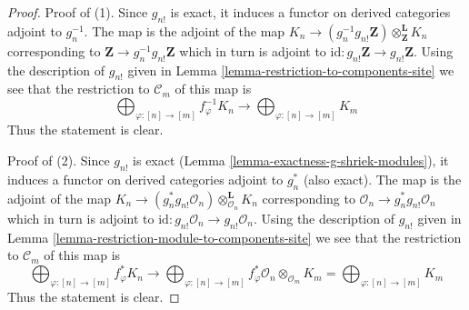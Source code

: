 \documentclass{stacks-project}
\theoremstyle{plain}
\theoremstyle{definition}
\theoremstyle{remark}
\numberwithin{equation}{subsection}
\begin{document}
\begin{proof}
Proof of (1). Since $g_{n!}$ is exact, it induces a functor
on derived categories adjoint to $g_n^{-1}$.
The map is the adjoint of the map
$K_n \to (g_n^{-1}g_{n!}\mathbf{Z}) \otimes^\mathbf{L}_\mathbf{Z} K_n$
corresponding to $\mathbf{Z} \to g_n^{-1}g_{n!}\mathbf{Z}$
which in turn is adjoint to
$\text{id} : g_{n!}\mathbf{Z} \to g_{n!}\mathbf{Z}$.
Using the description of $g_{n!}$
given in Lemma \ref{lemma-restriction-to-components-site}
we see that the restriction to $\mathcal{C}_m$ of this map
is
$$
\bigoplus\nolimits_{\varphi : [n] \to [m]} f_\varphi^{-1}K_n
\longrightarrow
\bigoplus\nolimits_{\varphi : [n] \to [m]} K_m
$$
Thus the statement is clear.

\medskip\noindent
Proof of (2). Since $g_{n!}$ is exact
(Lemma \ref{lemma-exactness-g-shriek-modules}), it induces a functor
on derived categories adjoint to $g_n^*$ (also exact).
The map is the adjoint of the map
$K_n \to (g_n^*g_{n!}\mathcal{O}_n) \otimes^\mathbf{L}_{\mathcal{O}_n} K_n$
corresponding to $\mathcal{O}_n \to g_n^*g_{n!}\mathcal{O}_n$
which in turn is adjoint to
$\text{id} : g_{n!}\mathcal{O}_n \to g_{n!}\mathcal{O}_n$.
Using the description of $g_{n!}$
given in Lemma \ref{lemma-restriction-module-to-components-site}
we see that the restriction to $\mathcal{C}_m$ of this map
is
$$
\bigoplus\nolimits_{\varphi : [n] \to [m]} f_\varphi^*K_n
\longrightarrow
\bigoplus\nolimits_{\varphi : [n] \to [m]}
f_\varphi^*\mathcal{O}_n \otimes_{\mathcal{O}_m} K_m =
\bigoplus\nolimits_{\varphi : [n] \to [m]} K_m
$$
Thus the statement is clear.
\end{proof}
\end{document}
